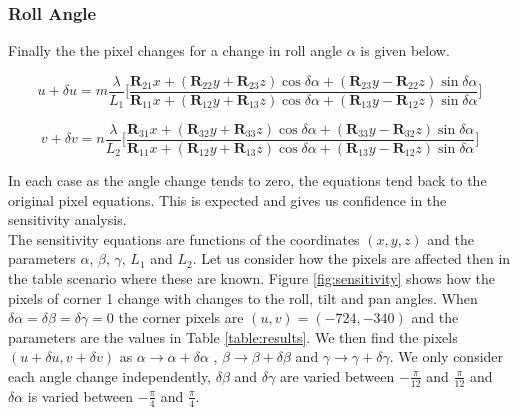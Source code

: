 \documentclass[12pt]{article}
\newcommand{\mtx}[1]{\ensuremath{\mathbf{#1}}}
\begin{document}
\subsubsection{Roll Angle}

Finally the the pixel changes for a change in roll angle $\alpha$ is given below.

\begin{equation}\label{dualpha}
    u + \delta u = m\frac{\lambda}{L_1}
        \bigg[\frac{\mtx{R}_{21}x + (\mtx{R}_{22}y + \mtx{R}_{23}z)\cos\delta\alpha 
                   +(\mtx{R}_{23}y - \mtx{R}_{22}z)\sin\delta\alpha}
                   {\mtx{R}_{11}x + (\mtx{R}_{12}y + \mtx{R}_{13}z)\cos\delta\alpha 
                   +(\mtx{R}_{13}y - \mtx{R}_{12}z)\sin\delta\alpha}                  
        \bigg]
\end{equation}

\begin{equation}\label{dvalpha}
    v + \delta v = n\frac{\lambda}{L_2}
        \bigg[\frac{\mtx{R}_{31}x + (\mtx{R}_{32}y + \mtx{R}_{33}z)\cos\delta\alpha 
                   +(\mtx{R}_{33}y - \mtx{R}_{32}z)\sin\delta\alpha}
                   {\mtx{R}_{11}x + (\mtx{R}_{12}y + \mtx{R}_{13}z)\cos\delta\alpha 
                   +(\mtx{R}_{13}y - \mtx{R}_{12}z)\sin\delta\alpha}                  
        \bigg]
\end{equation}

In each case as the angle change tends to zero, the equations tend back to the original pixel equations. This is expected and gives us confidence in the sensitivity analysis.\\
\newline
The sensitivity equations are functions of the coordinates $(x,y,z)$ and the parameters $\alpha$, $\beta$, $\gamma$, $L_1$ and $L_2$. Let us consider how the pixels are affected then in the table scenario where these are known. Figure \ref{fig:sensitivity} shows how the pixels of corner 1 change with changes to the roll, tilt and pan angles. When $\delta\alpha=\delta\beta=\delta\gamma=0$ the corner pixels are $(u,v) =(-724,-340)$ and the parameters are the values in Table \ref{table:results}. We then find the pixels $(u + \delta u,v + \delta v)$ as $\alpha \rightarrow \alpha + \delta\alpha$ , $\beta \rightarrow \beta + \delta\beta$ and $\gamma \rightarrow \gamma + \delta\gamma$. We only consider each angle change independently, $\delta\beta$ and $\delta\gamma$ are varied between $-\frac{\pi}{12}$ and  $\frac{\pi}{12}$ and $\delta\alpha$ is varied between $-\frac{\pi}{4}$ and  $\frac{\pi}{4}$.
\end{document}
